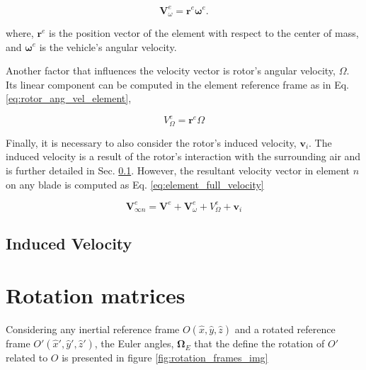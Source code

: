 \begin{equation}
    \mathbf{V}^e_\omega = \mathbf{r}^e  \boldsymbol{\omega}^e.
    \label{eq:line_ang_vec_element_frame}
\end{equation}

\noindent where, $\mathbf{r}^e$ is the position vector of the element with respect to the center of mass, and $\boldsymbol{\omega}^e$ is the vehicle's angular velocity.

Another factor that influences the velocity vector is rotor's angular velocity, $\Omega$. Its linear component can be computed in the element reference frame as in Eq. \ref{eq:rotor_ang_vel_element},

\begin{equation}
    V^e_{\Omega} = \mathbf{r}^e \Omega
    \label{eq:rotor_ang_vel_element}
\end{equation}

Finally, it is necessary to also consider the rotor’s induced velocity, $\mathbf{v}_i$. The induced velocity is a result of the rotor’s interaction with the surrounding air and is further detailed in Sec. \ref{sec:induced_Velocity}. However, the resultant velocity vector in element $n$ on any blade is computed as Eq. \ref{eq:element_full_velocity}

\begin{equation}
    \mathbf{V}_{\infty n}^e = \mathbf{V}^e + \mathbf{V}^e_\omega + V^e_{\Omega} + \mathbf{v}_i
    \label{eq:element_full_velocity}
\end{equation}

\subsection{Induced Velocity}
\label{sec:induced_Velocity}


\section{Rotation matrices}
\label{sec:rotation_matrices}

Considering any inertial reference frame $O(\hat{x},\hat{y},\hat{z})$ and a rotated reference frame $O'(\hat{x}',\hat{y}',\hat{z}')$, the Euler angles, $\boldsymbol{\Omega}_E$ that the define the rotation of $O'$ related to $O$ is presented in figure \ref{fig:rotation_frames_img}

